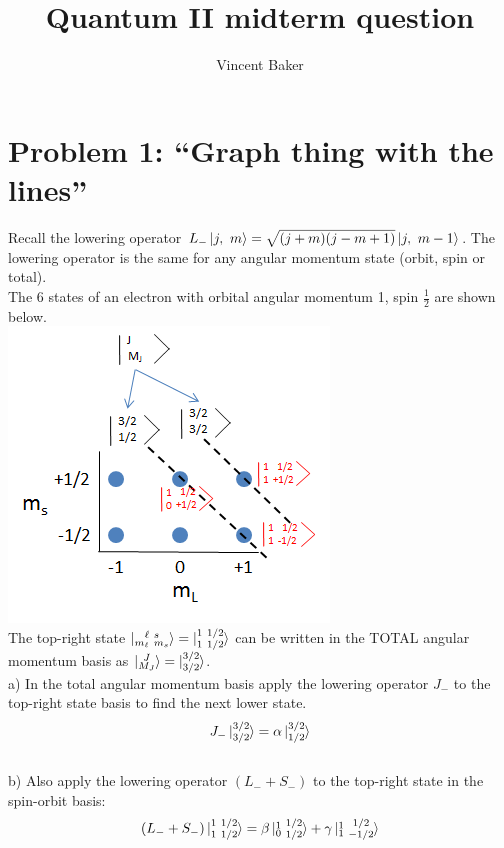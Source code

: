 \documentclass[a4paper,12pt]{article}
\title{Quantum II midterm question}
\author{Vincent Baker}
\numberwithin{equation}{section}
\begin{document}
\maketitle

\section{Problem 1: ``Graph thing with the lines''}
Recall the lowering operator $L_-\ket{j,\ m}=\sqrt{(j+m)(j-m+1)}\ket{j,\ m-1}$.
The lowering operator is the same for any angular momentum state (orbit, spin or total).\\
The 6 states of an electron with orbital angular momentum 1, spin $\frac{1}{2}$ are shown below.
\\
\includegraphics{momentum}
\\
The top-right state $\ket{\substack{\ell\ s\\m_\ell\ m_s}}=\ket{\substack{1\ 1/2\\ 1\ 1/2}}$ 
can be written in the TOTAL angular momentum basis as 
$\ket{\substack{J \\M_J}}=\ket{\substack{3/2 \\ 3/2} }$.\\
a) In the total angular momentum basis apply the lowering operator $J_-$ to the top-right state 
basis to find the next lower state.
\begin{gather}
 J_-\ket{ \substack{3/2 \\ 3/2} } = \alpha\ket{ \substack{3/2 \\ 1/2} }
\end{gather}
\\
b) Also apply the lowering operator $(L_-+S_-)$ to the top-right state in the spin-orbit basis:
\begin{gather}
 (L_-+S_-)\ket{\substack{1\ 1/2\\ 1\ 1/2}}=\beta\ket{\substack{1\\0}\ \substack{1/2\\1/2}}    
 + \gamma\ket{\substack{1\\1}\ \substack{1/2\\-1/2}}
\end{gather}
\end{document}
